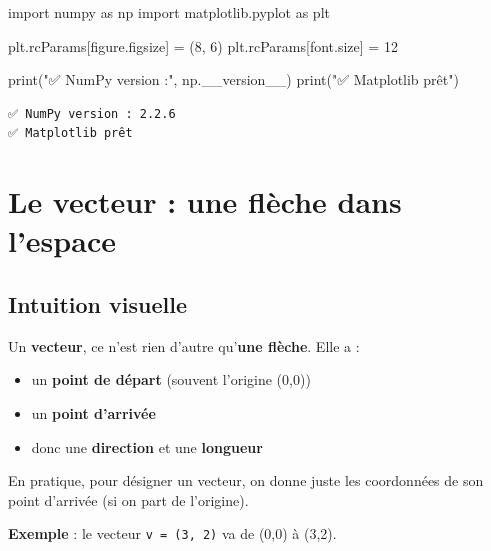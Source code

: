 \documentclass[
  french,
  11pt,
  a4paper,
]{scrbook}
\newenvironment{Shaded}{}{}
\newcommand{\BuiltInTok}[1]{\textcolor[rgb]{0.84,0.23,0.29}{#1}}
\newcommand{\DecValTok}[1]{\textcolor[rgb]{0.00,0.36,0.77}{#1}}
\newcommand{\ImportTok}[1]{\textcolor[rgb]{0.01,0.18,0.38}{#1}}
\newcommand{\NormalTok}[1]{\textcolor[rgb]{0.14,0.16,0.18}{#1}}
\newcommand{\OperatorTok}[1]{\textcolor[rgb]{0.14,0.16,0.18}{#1}}
\newcommand{\StringTok}[1]{\textcolor[rgb]{0.01,0.18,0.38}{#1}}
\providecommand{\tightlist}{%
  \setlength{\itemsep}{0pt}\setlength{\parskip}{0pt}}
\begin{document}
\protect{}\label{setup}
\begin{Shaded}
\begin{Highlighting}[]
\ImportTok{import}\NormalTok{ numpy }\ImportTok{as}\NormalTok{ np}
\ImportTok{import}\NormalTok{ matplotlib.pyplot }\ImportTok{as}\NormalTok{ plt}

\NormalTok{plt.rcParams[}\StringTok{\textquotesingle{}figure.figsize\textquotesingle{}}\NormalTok{] }\OperatorTok{=}\NormalTok{ (}\DecValTok{8}\NormalTok{, }\DecValTok{6}\NormalTok{)}
\NormalTok{plt.rcParams[}\StringTok{\textquotesingle{}font.size\textquotesingle{}}\NormalTok{] }\OperatorTok{=} \DecValTok{12}

\BuiltInTok{print}\NormalTok{(}\StringTok{"✅ NumPy version :"}\NormalTok{, np.\_\_version\_\_)}
\BuiltInTok{print}\NormalTok{(}\StringTok{"✅ Matplotlib prêt"}\NormalTok{)}
\end{Highlighting}
\end{Shaded}

\begin{verbatim}
✅ NumPy version : 2.2.6
✅ Matplotlib prêt
\end{verbatim}

\chapter{Le vecteur : une flèche dans
l'espace}\label{le-vecteur-une-fluxe8che-dans-lespace}

\section{Intuition visuelle}\label{intuition-visuelle}

Un \textbf{vecteur}, ce n'est rien d'autre qu'\textbf{une flèche}. Elle
a :

\begin{itemize}
\tightlist
\item
  un \textbf{point de départ} (souvent l'origine (0,0))
\item
  un \textbf{point d'arrivée}
\item
  donc une \textbf{direction} et une \textbf{longueur}
\end{itemize}

En pratique, pour désigner un vecteur, on donne juste les coordonnées de
son point d'arrivée (si on part de l'origine).

\textbf{Exemple} : le vecteur \texttt{v\ =\ (3,\ 2)} va de (0,0) à
(3,2).
\end{document}

